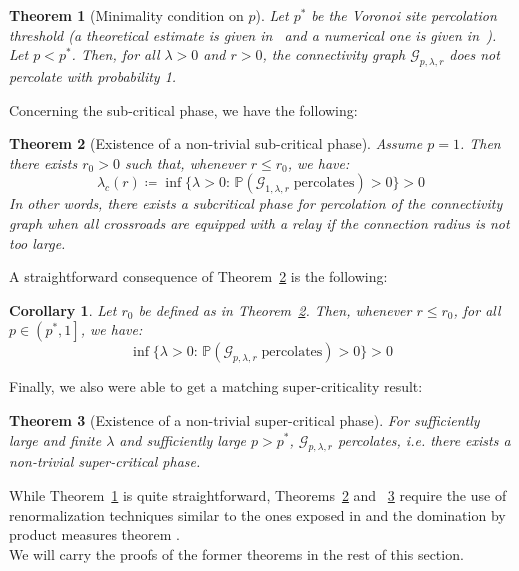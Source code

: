 \documentclass[10pt,a4paper]{amsart}
\theoremstyle{exampstyle}
\newtheorem{Theorem}{Theorem}
\newtheorem{Corollary}{Corollary}
\theoremstyle{exampnotations}
\begin{document}
\begin{Theorem}[Minimality condition on $p$]
\label{Thm.minimality}
Let $p^{*}$ be the Voronoi site percolation threshold (a theoretical estimate is given in~\cite{neher2008topological} and a numerical one is given in~\cite{becker_percolation_2009}). Let $p < p^*$. Then, for all $\lambda > 0$ and $r >0$, the connectivity graph $\mathcal{G}_{p,\lambda,r}$ does not percolate with probability 1.
\end{Theorem}

Concerning the sub-critical phase, we have the following:
\begin{Theorem}[Existence of a non-trivial sub-critical phase]
\label{Thm.subcritical}
Assume $p=1$. Then there exists $r_{0} > 0$ such that, whenever $r \leq r_0$, we have:
\begin{equation*}
    \lambda_c(r) \coloneqq \inf \lbrace \lambda > 0 : \, \mathbb{P}(\mathcal{G}_{1, \lambda, r} \; \text{percolates}) > 0 \rbrace > 0
\end{equation*}
In other words, there exists a subcritical phase for percolation of the connectivity graph when all crossroads are equipped with a relay if the connection radius is not too large.
\end{Theorem}

A straightforward consequence of Theorem~\ref{Thm.subcritical} is the following:

\begin{Corollary}
\label{Coroll.subcritical}
Let $r_0$ be defined as in Theorem~\ref{Thm.subcritical}. Then, whenever $r \leq r_{0}$, for all $p \in \left(p^*,1\right]$, we have:
\begin{equation*}
    \inf \lbrace \lambda > 0 : \, \mathbb{P}(\mathcal{G}_{p,\lambda,r} \; \text{percolates}) > 0 \rbrace > 0
\end{equation*}
\end{Corollary}

Finally, we also were able to get a matching super-criticality result:

\begin{Theorem}[Existence of a non-trivial super-critical phase]
\label{Thm.supercritical}
For sufficiently large and finite $\lambda$ and sufficiently large $p > p^*$, $\mathcal{G}_{p,\lambda,r}$ percolates, i.e. there exists a non-trivial super-critical phase.
\end{Theorem}

While Theorem~\ref{Thm.minimality} is quite straightforward, Theorems~\ref{Thm.subcritical} and ~\ref{Thm.supercritical} require the use of renormalization techniques similar to the ones exposed in \cite{hirsch2018continuum} and the domination by product measures theorem \cite[Theorem 0.0]{liggett_domination_1997}. \\
We will carry the proofs of the former theorems in the rest of this section.
\end{document}
